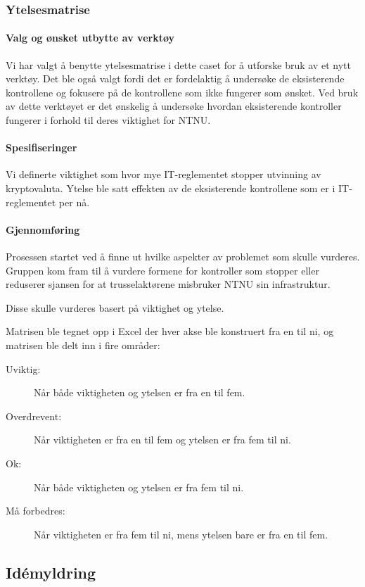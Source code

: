 \subsubsection{Ytelsesmatrise}

\paragraph{Valg og ønsket utbytte av verktøy}
Vi har valgt å benytte ytelsesmatrise i dette caset for å utforske bruk av et nytt verktøy. Det ble også valgt fordi det er fordelaktig å undersøke de eksisterende kontrollene og fokusere på de kontrollene som ikke fungerer som ønsket. Ved bruk av dette verktøyet er det ønskelig å undersøke hvordan eksisterende kontroller fungerer i forhold til deres viktighet for NTNU. 

\paragraph{Spesifiseringer}
Vi definerte viktighet som hvor mye IT-reglementet stopper utvinning av kryptovaluta. Ytelse ble satt effekten av de eksisterende kontrollene som er i IT-reglementet per nå.

\paragraph{Gjennomføring}
Prosessen startet ved å finne ut hvilke aspekter av problemet som skulle vurderes. Gruppen kom fram til å vurdere formene for kontroller som stopper eller reduserer sjansen for at trusselaktørene misbruker NTNU sin infrastruktur. 


Disse skulle vurderes basert på viktighet og ytelse. 

Matrisen ble tegnet opp i Excel der hver akse ble konstruert fra en til ni, og matrisen ble delt inn i fire områder:
\begin{description}
    \item[Uviktig:] Når både viktigheten og ytelsen er fra en til fem.
    \item[Overdrevent:] Når viktigheten er fra en til fem og ytelsen er fra fem til ni.
    \item[Ok:] Når både viktigheten og ytelsen er fra fem til ni.
    \item[Må forbedres:] Når viktigheten er fra fem til ni, mens ytelsen bare er fra en til fem.
\end{description}

\subsection{Idémyldring}

